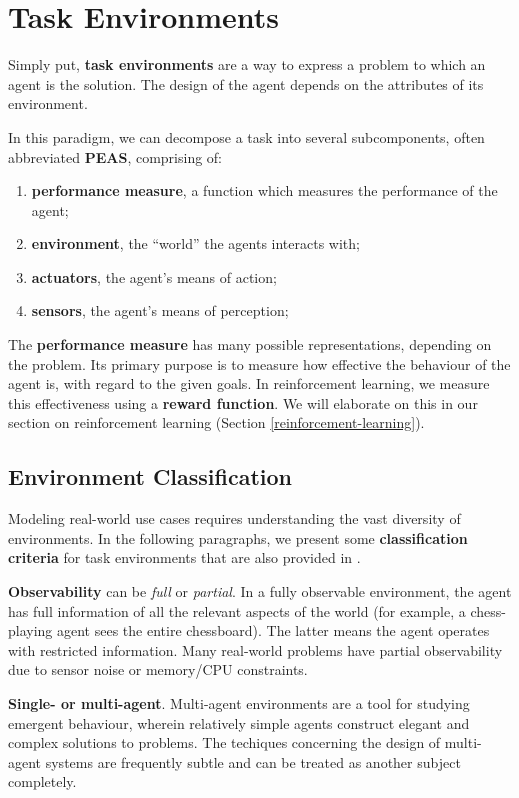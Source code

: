\section{Task Environments}
Simply put, \textbf{task environments} are a way to express a problem to which an agent is the solution.
The design of the agent depends on the attributes of its environment.

In this paradigm, we can decompose a task into several subcomponents, often abbreviated \textbf{PEAS}\cite{aima}, comprising of:
\begin{enumerate}
    \item \textbf{performance measure}, a function which measures the performance of the agent;
    \item \textbf{environment}, the ``world'' the agents interacts with;
    \item \textbf{actuators}, the agent's means of action;
    \item \textbf{sensors}, the agent's means of perception;
\end{enumerate}

The \textbf{performance measure} has many possible representations, depending on the problem.
Its primary purpose is to measure how effective the behaviour of the agent is, with regard to the given goals.
In reinforcement learning, we measure this effectiveness using a \textbf{reward function}.
We will elaborate on this in our section on reinforcement learning (Section \ref{reinforcement-learning}).

\subsection{Environment Classification}

Modeling real-world use cases requires understanding the vast diversity of environments.
In the following paragraphs, we present some \textbf{classification criteria} for task environments that are also provided in \cite{aima}.

\textbf{Observability} can be \emph{full} or \emph{partial}.
In a fully observable environment, the agent has full information of all the relevant aspects of the world (for example, a chess-playing agent sees the entire chessboard).
The latter means the agent operates with restricted information.
Many real-world problems have partial observability due to sensor noise or memory/CPU constraints.

\textbf{Single- or multi-agent}.
Multi-agent environments are a tool for studying emergent behaviour, wherein relatively simple agents construct elegant and complex solutions to problems.
The techiques concerning the design of multi-agent systems are frequently subtle and can be treated as another subject completely.

